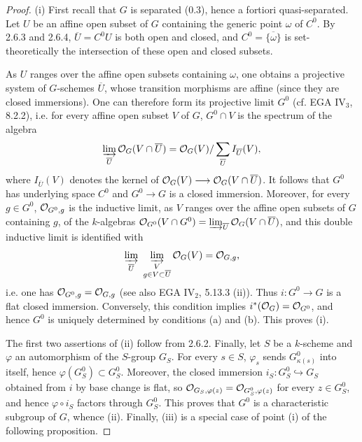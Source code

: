 \begin{proof}
(i) First recall that $G$ is separated (0.3), hence a fortiori quasi-separated. Let $U$ be an affine open subset of $G$ containing the generic point $\omega$ of $C^0$. By 2.6.3 and 2.6.4, $\overline U=C^0U$ is both open and closed, and $C^0=\overline{\{\omega\}}$ is set-theoretically the intersection of these open and closed subsets.

As $U$ ranges over the affine open subsets containing $\omega$, one obtains a projective system of $G$-schemes $\overline U$, whose transition morphisms are affine (since they are closed immersions). One can therefore form its projective limit $G^0$ (cf. EGA IV$_3$, 8.2.2), i.e. for every affine open subset $V$ of $G$, $G^0\cap V$ is the spectrum of the algebra
\[
\varinjlim_{\overline U}\mathcal{O}_G(V\cap\overline U)=\mathcal{O}_G(V)/\sum_{\overline U}I_{\overline U}(V),
\]
where $I_{\overline U}(V)$ denotes the kernel of $\mathcal{O}_G(V)\longrightarrow\mathcal{O}_G(V\cap\overline U)$. It follows that $G^0$ has underlying space $C^0$ and $G^0\to G$ is a closed immersion. Moreover, for every $g\in G^0$, $\mathcal{O}_{G^0,g}$ is the inductive limit, as $V$ ranges over the affine open subsets of $G$ containing $g$, of the $k$-algebras $\mathcal{O}_{G^0}(V\cap G^0)=\varinjlim_{\overline U}\mathcal{O}_G(V\cap\overline U)$, and this double inductive limit is identified with
\[
\varinjlim_{\overline U}\ \varinjlim_{\substack{V\\g\in V\subset\overline U}}\OO_G(V)=\OO_{G,g},
\]
i.e. one has $\mathcal{O}_{G^0,g}=\mathcal{O}_{G,g}$ (see also EGA IV$_2$, 5.13.3 (ii)). Thus $i:G^0\to G$ is a flat closed immersion. Conversely, this condition implies $i^*(\mathcal{O}_G)=\mathcal{O}_{G^0}$, and hence $G^0$ is uniquely determined by conditions (a) and (b). This proves (i).

The first two assertions of (ii) follow from 2.6.2. Finally, let $S$ be a $k$-scheme and $\varphi$ an automorphism of the $S$-group $G_S$. For every $s\in S$, $\varphi_s$ sends $G^0_{\kappa(s)}$ into itself, hence $\varphi(G^0_S)\subset G^0_S$. Moreover, the closed immersion $i_S:G^0_S\hookrightarrow G_S$ obtained from $i$ by base change is flat, so $\mathcal{O}_{G_S,\varphi(z)}=\mathcal{O}_{G^0_S,\varphi(z)}$ for every $z\in G^0_S$, and hence $\varphi\circ i_S$ factors through $G^0_S$. This proves that $G^0$ is a characteristic subgroup of $G$, whence (ii). Finally, (iii) is a special case of point (i) of the following proposition.
\end{proof}
